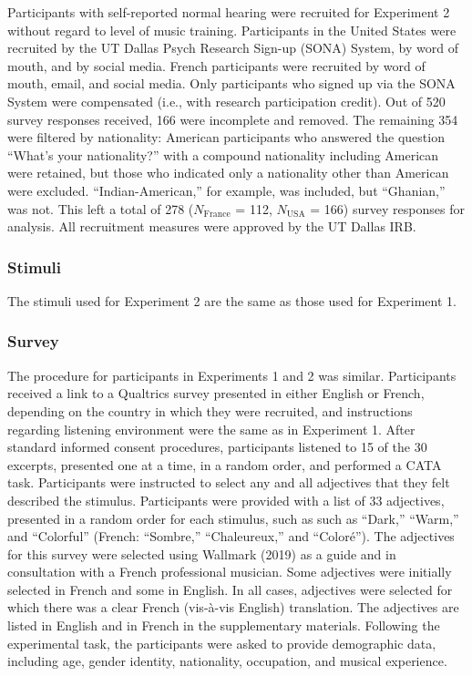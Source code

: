 \documentclass[
  english,
  man,floatsintext]{apa6}
\begin{document}
Participants with self-reported normal hearing were recruited for Experiment 2 without regard to level of music training. Participants in the United States were recruited by the UT Dallas Psych Research Sign-up (SONA) System, by word of mouth, and by social media. French participants were recruited by word of mouth, email, and social media. Only participants who signed up via the SONA System were compensated (i.e., with research participation credit). Out of 520 survey responses received, 166 were incomplete and removed. The remaining 354 were filtered by nationality: American participants who answered the question ``What's your nationality?'' with a compound nationality including American were retained, but those who indicated only a nationality other than American were excluded. ``Indian-American,'' for example, was included, but ``Ghanian,'' was not. This left a total of 278 (\(N\mathrm{_{France}}\) = 112, \(N\mathrm{_{USA}}\) = 166) survey responses for analysis. All recruitment measures were approved by the UT Dallas IRB.

\hypertarget{stimuli-1}{%
\subsubsection{Stimuli}\label{stimuli-1}}

The stimuli used for Experiment 2 are the same as those used for Experiment 1.

\hypertarget{survey-1}{%
\subsubsection{Survey}\label{survey-1}}

The procedure for participants in Experiments 1 and 2 was similar. Participants received a link to a Qualtrics survey presented in either English or French, depending on the country in which they were recruited, and instructions regarding listening environment were the same as in Experiment 1. After standard informed consent procedures, participants listened to 15 of the 30 excerpts, presented one at a time, in a random order, and performed a CATA task. Participants were instructed to select any and all adjectives that they felt described the stimulus. Participants were provided with a list of 33 adjectives, presented in a random order for each stimulus, such as such as ``Dark,'' ``Warm,'' and ``Colorful'' (French: ``Sombre,'' ``Chaleureux,'' and ``Coloré''). The adjectives for this survey were selected using Wallmark (2019) as a guide and in consultation with a French professional musician. Some adjectives were initially selected in French and some in English. In all cases, adjectives were selected for which there was a clear French (vis-à-vis English) translation. The adjectives are listed in English and in French in the supplementary materials. Following the experimental task, the participants were asked to provide demographic data, including age, gender identity, nationality, occupation, and musical experience.
\end{document}
